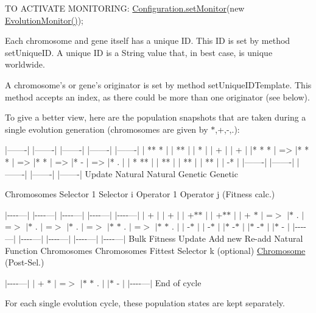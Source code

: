 T\-O A\-C\-T\-I\-V\-A\-T\-E M\-O\-N\-I\-T\-O\-R\-I\-N\-G\-: \hyperlink{classorg_1_1jgap_1_1_configuration_a836ee94d0df06bf651d4d5d9dfddf4ae}{Configuration.\-set\-Monitor}(new \hyperlink{classorg_1_1jgap_1_1audit_1_1_evolution_monitor_a294afadc9f2e15ba3d4a9ed5a5ed5682}{Evolution\-Monitor()});

Each chromosome and gene itself has a unique I\-D. This I\-D is set by method set\-Unique\-I\-D. A unique I\-D is a String value that, in best case, is unique worldwide.

A chromosome's or gene's originator is set by method set\-Unique\-I\-D\-Template. This method accepts an index, as there could be more than one originator (see below). 



To give a better view, here are the population snapshots that are taken during a single evolution generation (chromosomes are given by $\ast$,+,-\/,.)\-: \begin{DoxyVerb}|-------|      |-------|      |-------|      |-------|      |-------|
| ** *  |      | **    |      |  *    |      |  +    |      |  +    |
|* *  * |  =>  |* *  * |  =>  |*    * |  =>  |*    - |  =>  |*    . |
| * **  |      |   **  |      |   **  |      |   **  |      |   -*  |
|-------|      |-------|      |-------|      |-------|      |-------|
  Update        Natural        Natural        Genetic        Genetic
\end{DoxyVerb}
 Chromosomes Selector 1 Selector i Operator 1 Operator j (Fitness calc.)

$|$-\/-\/-\/-\/---$|$ $|$-\/-\/-\/-\/---$|$ $|$-\/-\/-\/-\/---$|$ $|$-\/-\/-\/-\/---$|$ $|$-\/-\/-\/-\/---$|$ $|$ + $|$ $|$ + $|$ $|$ +$\ast$$\ast$ $|$ $|$ +$\ast$$\ast$ $|$ $|$ + $\ast$ $|$ =$>$ $|$$\ast$ . $|$ =$>$ $|$$\ast$ . $|$ =$>$ $|$$\ast$ . $|$ =$>$ $|$$\ast$ $\ast$ . $|$ =$>$ $|$$\ast$ $\ast$ . $|$ $|$ -\/$\ast$ $|$ $|$ -\/$\ast$ $|$ $|$$\ast$ -\/$\ast$ $|$ $|$$\ast$ -\/$\ast$ $|$ $|$$\ast$ -\/ $|$ $|$-\/-\/-\/-\/---$|$ $|$-\/-\/-\/-\/---$|$ $|$-\/-\/-\/-\/---$|$ $|$-\/-\/-\/-\/---$|$ $|$-\/-\/-\/-\/---$|$ Bulk Fitness Update Add new Re-\/add Natural Function Chromosomes Chromosomes Fittest Selector k (optional) \hyperlink{classorg_1_1jgap_1_1_chromosome}{Chromosome} (Post-\/\-Sel.)

$|$-\/-\/-\/-\/---$|$ $|$ + $\ast$ $|$ =$>$ $|$$\ast$ $\ast$ . $|$ $|$$\ast$ -\/ $|$ $|$-\/-\/-\/-\/---$|$ End of cycle

For each single evolution cycle, these population states are kept separately. 



